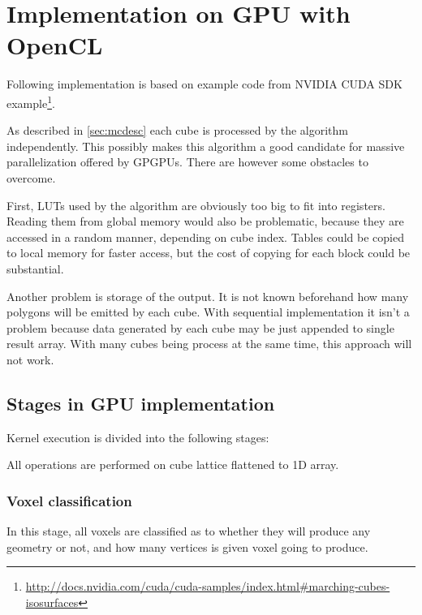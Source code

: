 \section{Implementation on GPU with OpenCL}
\label{sec:mcgpu}
Following implementation is based on example code from NVIDIA CUDA SDK
example\footnote{\url{http://docs.nvidia.com/cuda/cuda-samples/index.html\#marching-cubes-isosurfaces}}.

As described in \autoref{sec:mcdesc} each cube is processed by the algorithm
independently. This possibly makes this algorithm a good candidate for massive
parallelization offered by GPGPUs. There are however some obstacles to overcome.

First, LUTs used by the algorithm are obviously too big to fit into registers.
Reading them from global memory would also be problematic, because they are
accessed in a random manner, depending on cube index. Tables could be copied
to local memory for faster access, but the cost of copying for each block could
be substantial.

Another problem is storage of the output. It is not known beforehand how many
polygons will be emitted by each cube. With sequential implementation it isn't a
problem because data generated by each cube may be just appended to single
result array. With many cubes being process at the same time, this approach
will not work.

\subsection{Stages in GPU implementation}
Kernel execution is divided into the following stages:

All operations are performed on cube lattice flattened to 1D array.
\subsubsection{Voxel classification}

In this stage, all voxels are classified as to whether they will produce any
geometry or not, and how many vertices is given voxel going to produce.

